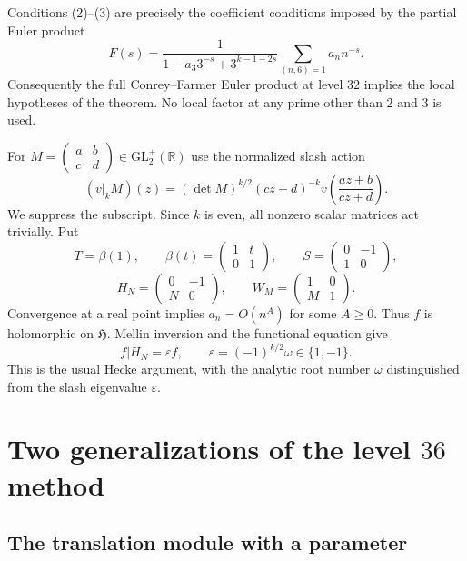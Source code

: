 \documentclass[11pt]{article}
\theoremstyle{remark}
\newcommand{\HH}{\mathfrak H}
\newcommand{\eps}{\varepsilon}
\newcommand{\bb}{\beta}
\begin{document}
Conditions (2)--(3) are precisely the coefficient conditions imposed by
the partial Euler product
\[
 F(s)=\frac{1}{1-a_3 3^{-s}+3^{k-1-2s}}
       \sum_{(n,6)=1}a_n n^{-s}.
\]
Consequently the full Conrey--Farmer Euler product at level $32$
implies the local hypotheses of the theorem. No local factor at any
prime other than $2$ and $3$ is used.

For $M=\left(\begin{smallmatrix}a&b\\c&d\end{smallmatrix}\right)
\in\mathrm{GL}_2^+(\mathbb R)$ use the normalized slash action
\[
 (v|_kM)(z)=(\det M)^{k/2}(cz+d)^{-k}
 v\left(\frac{az+b}{cz+d}\right).
\]
We suppress the subscript. Since $k$ is even, all nonzero scalar
matrices act trivially. Put
\[
 T=\bb(1),\qquad
 \bb(t)=\begin{pmatrix}1&t\\0&1\end{pmatrix},\qquad
 S=\begin{pmatrix}0&-1\\1&0\end{pmatrix},
\]
\[
 H_N=\begin{pmatrix}0&-1\\N&0\end{pmatrix},\qquad
 W_M=\begin{pmatrix}1&0\\M&1\end{pmatrix}.
\]
Convergence at a real point implies $a_n=O(n^A)$ for some $A\geq0$.
Thus $f$ is holomorphic on $\HH$. Mellin inversion and the functional
equation give
\begin{equation}\label{eq:fricke}
 f|H_N=\eps f,\qquad \eps=(-1)^{k/2}\omega\in\{1,-1\}.
\end{equation}
This is the usual Hecke argument, with the analytic root number
$\omega$ distinguished from the slash eigenvalue $\eps$.

\section{Two generalizations of the level \texorpdfstring{$36$}{36} method}

\subsection{The translation module with a parameter}
\end{document}

